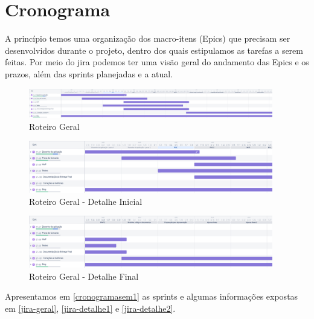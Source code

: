 \section{Cronograma}

A princípio temos uma organização dos macro-itens (Epics) que precisam ser desenvolvidos durante o projeto, dentro dos quais estipulamos as tarefas a serem feitas. Por meio do \gls{jira} podemos ter uma visão geral do andamento das Epics e os prazos, além das \glspl{sprint} planejadas e a atual.

\begin{figure}[H]
	\centering
	\caption{\label{jira-geral}Roteiro Geral}
	\includegraphics[width=0.95\textwidth]{imagens/cronograma-geral.png}
\end{figure}

\begin{figure}[H]
	\centering
	\caption{\label{jira-detalhe1}Roteiro Geral - Detalhe Inicial}
	\includegraphics[width=0.95\textwidth]{imagens/cronograma-detalhe1.png}
\end{figure}

\begin{figure}[H]
	\centering
	\caption{\label{jira-detalhe2}Roteiro Geral - Detalhe Final}
	\includegraphics[width=0.95\textwidth]{imagens/cronograma-detalhe2.png}
\end{figure}

Apresentamos em \autoref{cronogramasem1} as \glspl{sprint} e algumas informações expostas em \autoref{jira-geral}, \autoref{jira-detalhe1} e \autoref{jira-detalhe2}.


